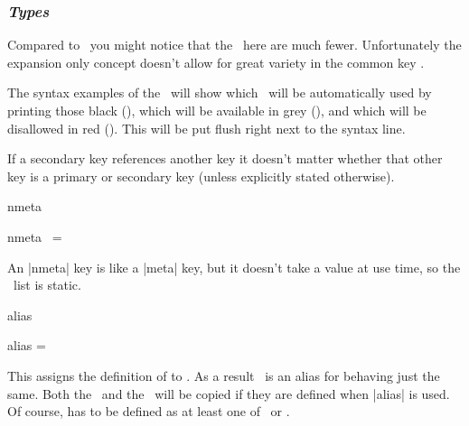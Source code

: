 \subsubsection{\textit{Types}\label{sec:c:secondarytypes}}

Compared to \expkvd\ you might notice that the \types\ here are much fewer.
Unfortunately the expansion only concept doesn't allow for great variety in the
common key \types.

The syntax examples of the \types\ will show which \prefix\ will be
automatically used by printing those black (\texttt{}), which
will be available in grey (\texttt{}), and which will be
disallowed in red (\texttt{}). This will be put flush right next
to the syntax line.

If a secondary key references another key it doesn't matter whether that other
key is a primary or secondary key (unless explicitly stated otherwise).


\begin{function}[module=expkv-cs type]{nmeta}
  \begin{syntax}
    nmeta \key\ = \kvarg {}
  \end{syntax}
  An |nmeta| key is like a |meta| key, but it doesn't take a value at use time,
  so the \kv\ list is static.
\end{function}

\begin{function}[module=expkv-cs type]{alias}
  \begin{syntax}
    alias  =  
  \end{syntax}
  This assigns the definition of  to \key. As a result \key\ is an
  alias for  behaving just the same. Both the \Vkey\ and the \Nkey\
  will be copied if they are defined when |alias| is used. Of course,
  \meta{key_2} has to be defined as at least one of \Nkey\ or \Vkey.
\end{function}

